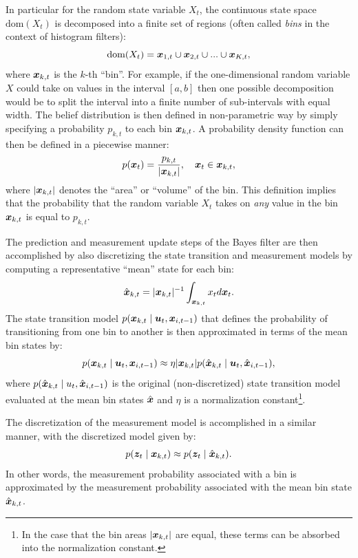 In particular for the random state variable $X_t$, the continuous state space $\text{dom}(X_t)$ is decomposed into a finite set of regions (often called \textit{bins} in the context of histogram filters):
\begin{equation}
\text{dom}(X_t) = \bm{x}_{1,t} \cup \bm{x}_{2,t} \cup ... \cup \bm{x}_{K,t},
\end{equation}
where $\bm{x}_{k,t}$ is the $k$-th ``bin''.
For example, if the one-dimensional random variable $X$ could take on values in the interval $[a,b]$ then one possible decomposition would be to split the interval into a finite number of sub-intervals with equal width.
The belief distribution is then defined in non-parametric way by simply specifying a probability $p_{k,t}$ to each bin $\bm{x}_{k,t}$. A probability density function can then be defined in a piecewise manner:
\begin{equation}
p(\bm{x}_t) = \frac{p_{k,t}}{\lvert \bm{x}_{k,t} \rvert}, \quad \bm{x}_t \in \bm{x}_{k,t},
\end{equation}
where $\lvert \bm{x}_{k,t} \rvert$ denotes the ``area'' or ``volume'' of the bin.
This definition implies that the probability that the random variable $X_t$ takes on \textit{any} value in the bin $\bm{x}_{k,t}$ is equal to $p_{k,t}$.

The prediction and measurement update steps of the Bayes filter are then accomplished by also discretizing the state transition and measurement models by computing a representative ``mean'' state for each bin:
\begin{equation}
\hat{\bm{x}}_{k,t} = \lvert \bm{x}_{k,t} \rvert ^{-1}\int_{\bm{x}_{k,t}}x_t d \bm{x}_t.
\end{equation}
The state transition model $p(\bm{x}_{k,t} \mid \bm{u}_t, \bm{x}_{i,t-1})$ that defines the probability of transitioning from one bin to another is then approximated in terms of the mean bin states by:
\begin{equation}
p(\bm{x}_{k,t} \mid \bm{u}_t, \bm{x}_{i,t-1}) \approx \eta \lvert \bm{x}_{k,t} \rvert p(\hat{\bm{x}}_{k,t} \mid \bm{u}_t, \hat{\bm{x}}_{i,t-1}),
\end{equation}
where $p(\hat{\bm{x}}_{k,t} \mid u_t, \hat{\bm{x}}_{i,t-1})$ is the original (non-discretized) state transition model evaluated at the mean bin states $\hat{\bm{x}}$ and $\eta$ is a normalization constant\footnote{In the case that the bin areas $\lvert \bm{x}_{k,t} \rvert$ are equal, these terms can be absorbed into the normalization constant.}.

The discretization of the measurement model is accomplished in a similar manner, with the discretized model given by:
\begin{equation}
p(\bm{z}_t \mid \bm{x}_{k,t}) \approx p(\bm{z}_t \mid \hat{\bm{x}}_{k,t}).
\end{equation}
In other words, the measurement probability associated with a bin is approximated by the measurement probability associated with the mean bin state $\hat{\bm{x}}_{k,t}$.

